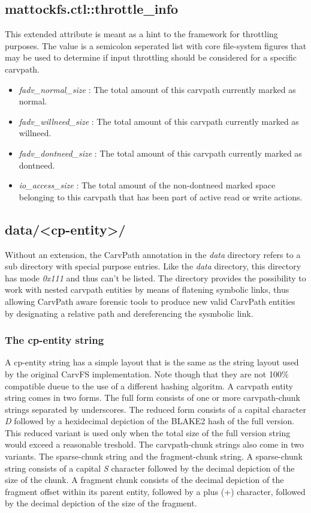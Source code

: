 \subsection{mattockfs.ctl::throttle\_info}
This extended attribute is meant as a hint to the framework for throttling purposes. The value is a semicolon seperated list with core file-system figures that may be used to determine if input throttling should be considered for a specific carvpath. 
\begin{itemize}
\item \emph{fadv\_normal\_size} : The total amount of this carvpath currently marked as normal.
\item \emph{fadv\_willneed\_size} : The total amount of this carvpath currently marked as willneed.
\item \emph{fadv\_dontneed\_size} : The total amount of this carvpath currently marked as dontneed.
\item \emph{io\_access\_size} : The total amount of the non-dontneed marked space belonging to this carvpath that has been part of active read or write actions.
\end{itemize}


\subsection{data/<cp-entity>/}
Without an extension, the CarvPath annotation in the \emph{data} directory refers to a sub directory with special purpose entries. Like the \emph{data} directory, this directory has mode \emph{0x111} and thus can't be listed. The directory provides the possibility to work with nested carvpath entities by means of flatening symbolic links, thus allowing CarvPath aware forensic tools to produce new valid CarvPath entities by designating a relative path and dereferencing the sysmbolic link.
\subsubsection{The cp-entity string}
A cp-entity string has a simple layout that is the same as the string layout used by the original CarvFS implementation. Note though that they are not 100\% compatible dueue to the use of a different hashing algoritm. A carvpath entity string comes in two forms. The full form consists of one or more carvpath-chunk strings separated by underscores. The reduced form consists of a capital character \emph{D} followed by a hexidecimal depiction of the BLAKE2 hash of the full version. This reduced variant is used only when the total size of the full version string would exceed a reasonable treshold. The carvpath-chunk strings also come in two variants. The sparse-chunk string and the fragment-chunk string. A sparse-chunk string consists of a capital \emph{S} character followed by the decimal depiction of the size of the chunk. A fragment chunk consists of the decimal depiction of the fragment offset within its parent entity, followed by a plus (+) character, followed by the decimal depiction of the size of the fragment.

